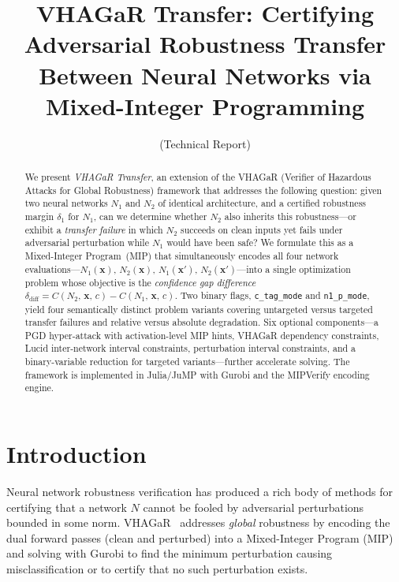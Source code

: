 \documentclass[11pt,a4paper]{article}
\title{\textbf{VHAGaR Transfer: Certifying Adversarial Robustness Transfer Between Neural Networks via Mixed-Integer Programming}}
\author{(Technical Report)}
\date{}
\theoremstyle{definition}
\theoremstyle{plain}
\newcommand{\Conf}[3]{C(#1,\,#2,\,#3)}
\newcommand{\NN}[1]{N_{#1}}
\newcommand{\vx}{\mathbf{x}}
\newcommand{\deltadiff}{\delta_{\mathrm{diff}}}
\newcommand{\deltaone}{\delta_1}
\begin{document}
\maketitle

\begin{abstract}
We present \emph{VHAGaR Transfer}, an extension of the VHAGaR (Verifier of Hazardous Attacks for Global Robustness) framework that addresses the following question: given two neural networks $\NN{1}$ and $\NN{2}$ of identical architecture, and a certified robustness margin $\deltaone$ for $\NN{1}$, can we determine whether $\NN{2}$ also inherits this robustness---or exhibit a \emph{transfer failure} in which $\NN{2}$ succeeds on clean inputs yet fails under adversarial perturbation while $\NN{1}$ would have been safe? We formulate this as a Mixed-Integer Program~(MIP) that simultaneously encodes all four network evaluations---$\NN{1}(\vx)$, $\NN{2}(\vx)$, $\NN{1}(\vx')$, $\NN{2}(\vx')$---into a single optimization problem whose objective is the \emph{confidence gap difference} $\deltadiff = \Conf{\NN{2}}{\vx}{c} - \Conf{\NN{1}}{\vx}{c}$. Two binary flags, \texttt{c\_tag\_mode} and \texttt{n1\_p\_mode}, yield four semantically distinct problem variants covering untargeted versus targeted transfer failures and relative versus absolute degradation. Six optional components---a PGD hyper-attack with activation-level MIP hints, VHAGaR dependency constraints, Lucid inter-network interval constraints, perturbation interval constraints, and a binary-variable reduction for targeted variants---further accelerate solving. The framework is implemented in Julia/JuMP with Gurobi and the MIPVerify encoding engine.
\end{abstract}

\tableofcontents
\newpage

\section{Introduction}

Neural network robustness verification has produced a rich body of methods for certifying that a network $N$ cannot be fooled by adversarial perturbations bounded in some norm. VHAGaR~\cite{vaghar} addresses \emph{global} robustness by encoding the dual forward passes (clean and perturbed) into a Mixed-Integer Program (MIP) and solving with Gurobi to find the minimum perturbation causing misclassification or to certify that no such perturbation exists.
\end{document}
